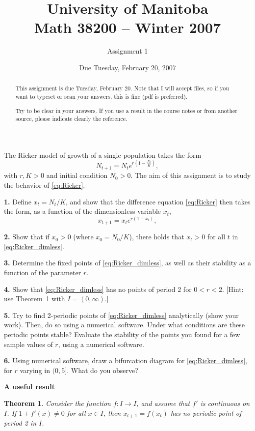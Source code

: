 \documentclass[12pt]{article}
\title{University of Manitoba\\ Math 38200 -- Winter 2007}
\author{Assignment 1}
\date{Due Tuesday, February 20, 2007}
\theoremstyle{plain}
\newtheorem{theorem}{Theorem}
\begin{document}
\maketitle
\begin{abstract}
This assignment is due Tuesday, February 20. Note that I will accept files, so if you want to typeset or scan your answers, this is fine (pdf is preferred).

Try to be clear in your answers. If you use a result in the course notes or from another source, please indicate clearly the reference. 
\end{abstract}

\vskip1cm
\noindent
The Ricker model of growth of a single population takes the form
\begin{equation}\label{eq:Ricker}
N_{t+1}=N_t e^{r\left(1-\frac{N_t}K\right)},
\end{equation}
with $r,K>0$ and initial condition $N_0>0$. The aim of this assignment is to study the behavior of \eqref{eq:Ricker}.

\vskip1cm
\noindent
{\bf 1.} Define $x_t=N_t/K$, and show that the difference equation \eqref{eq:Ricker} then takes the form, as a function of the dimensionless variable $x_t$,
\begin{equation}\label{eq:Ricker_dimless}
x_{t+1}=x_t e^{r(1-x_t)},
\end{equation}

\vskip0.4cm
\noindent
{\bf 2.} Show that if $x_0>0$ (where $x_0=N_0/K$), there holds that $x_t>0$ for all $t$ in \eqref{eq:Ricker_dimless}.

\vskip0.4cm
\noindent
{\bf 3.} 
Determine the fixed points of \eqref{eq:Ricker_dimless}, as well as their stability as a function of the parameter $r$.

\vskip0.4cm
\noindent
{\bf 4.} 
Show that \eqref{eq:Ricker_dimless} has no points of period 2 for $0<r<2$. [Hint: use Theorem~\ref{th:nonexistFP2} with $I=(0,\infty)$.]

\vskip0.4cm
\noindent
{\bf 5.} 
Try to find 2-periodic points of \eqref{eq:Ricker_dimless} analytically (show your work). Then, do so using a numerical software. Under what conditions are these periodic points stable? Evaluate the stability of the points you found for a few sample values of $r$, using a numerical software.

\vskip0.4cm
\noindent
{\bf 6.} 
Using numerical software, draw a bifurcation diagram for \eqref{eq:Ricker_dimless}, for $r$ varying in $(0,5]$. What do you observe?


\begin{center}
\bf A useful result
\end{center}
\begin{theorem}\label{th:nonexistFP2}
Consider the function $f:I\to I$, and assume that $f'$ is continuous on $I$. If $1+f'(x)\neq 0$ for all $x\in I$, then $x_{t+1}=f(x_t)$ has no periodic point of period 2 in $I$.
\end{theorem}
\end{document}
